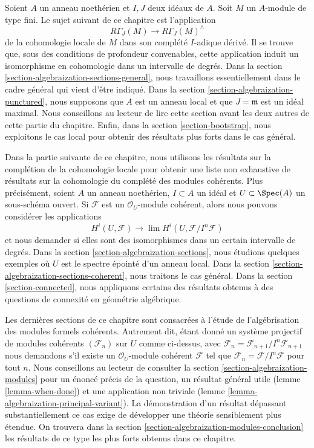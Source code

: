 \medskip\noindent
Soient $A$ un anneau noethérien et $I, J$ deux idéaux de $A$.
Soit $M$ un $A$-module de type fini.
Le sujet suivant de ce chapitre est l'application
$$
R\Gamma_J(M) \longrightarrow R\Gamma_J(M)^\wedge
$$
de la cohomologie locale de $M$ dans son complété $I$-adique dérivé.
Il se trouve que, sous des conditions de profondeur convenables,
cette application induit un isomorphisme en cohomologie dans un intervalle de degrés.
Dans la section \ref{section-algebraization-sections-general},
nous travaillons essentiellement dans le cadre général qui vient d'être indiqué.
Dans la section \ref{section-algebraization-punctured},
nous supposons que $A$ est un anneau local et que $J = \mathfrak m$ est un idéal maximal.
Nous conseillons au lecteur de lire cette section avant les deux autres
de cette partie du chapitre.
Enfin, dans la section \ref{section-bootstrap}, nous exploitons
le cas local pour obtenir des résultats plus forts dans le cas général.

\medskip\noindent
Dans la partie suivante de ce chapitre, nous utilisons les résultats sur
la complétion de la cohomologie locale pour obtenir une liste non exhaustive de résultats sur
la cohomologie du complété des modules cohérents.
Plus précisément, soient $A$ un anneau noethérien, $I \subset A$
un idéal et $U \subset \Spec(A)$ un sous-schéma ouvert.
Si $\mathcal{F}$ est un $\mathcal{O}_U$-module cohérent, alors
nous pouvons considérer les applications
$$
H^i(U, \mathcal{F}) \longrightarrow \lim H^i(U, \mathcal{F}/I^n\mathcal{F})
$$
et nous demander si elles sont des isomorphismes dans un certain intervalle de degrés.
Dans la section \ref{section-algebraization-sections},
nous étudions quelques exemples où $U$ est le spectre épointé
d'un anneau local. Dans la section \ref{section-algebraization-sections-coherent},
nous traitons le cas général.
Dans la section \ref{section-connected}, nous appliquons certains des résultats
obtenus à des questions de connexité en géométrie algébrique.

\medskip\noindent
Les dernières sections de ce chapitre sont consacrées à l'étude
de l'algébrisation des modules formels cohérents. Autrement dit, étant donné
un système projectif de modules cohérents $(\mathcal{F}_n)$ sur $U$
comme ci-dessus, avec
$\mathcal{F}_n = \mathcal{F}_{n + 1}/I^n\mathcal{F}_{n + 1}$
nous demandons s'il existe un $\mathcal{O}_U$-module cohérent
$\mathcal{F}$ tel que
$\mathcal{F}_n = \mathcal{F}/I^n\mathcal{F}$
pour tout $n$. Nous conseillons au lecteur de consulter la
section \ref{section-algebraization-modules}
pour un énoncé précis de la question, un résultat général utile
(lemme \ref{lemma-when-done}) et une application non triviale
(lemme \ref{lemma-algebraization-principal-variant}).
La démonstration d'un résultat dépassant substantiellement ce cas
exige de développer une théorie sensiblement plus étendue.
On trouvera dans la section \ref{section-algebraization-modules-conclusion}
les résultats de ce type les plus forts obtenus dans ce chapitre.



